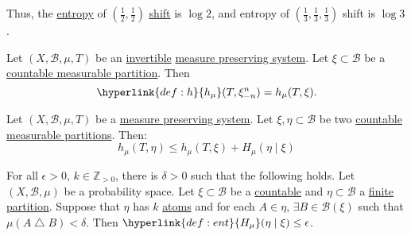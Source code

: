 \documentclass{article}
\newcommand{\sym}{\bigtriangleup}
\begin{document}
\color{black}
Thus, the \hyperlink{def:h}{entropy} of $(\frac{1}{2},\frac{1}{2})$ \hyperlink{def:bernoullishift}{shift} is $\log 2$, and entropy of $(\frac{1}{3},\frac{1}{3},\frac{1}{3})$ shift is $\log 3$.
\begin{nlemma}\label{lem:1}
  Let $(X, \mathcal{B},\mu,T)$ be an \hyperlink{def:inv}{invertible} \hyperlink{def:mps}{measure preserving system}.
  Let $\xi \subset \mathcal{B}$ be a \hyperlink{def:partition}{countable measurable partition}.
  Then
  \begin{equation*}
    \hyperlink{def:h}{h_\mu}(T, \xi_{-n}^n) = h_\mu(T, \xi).
  \end{equation*}
\end{nlemma}
\begin{nlemma}\label{lem:2}
  Let $(X, \mathcal{B}, \mu, T)$ be a \hyperlink{def:mps}{measure preserving system}. Let $\xi, \eta \subset \mathcal{B}$ be two \hyperlink{def:partition}{countable measurable partitions}. Then:
  \begin{equation*}
    h_\mu(T, \eta) \leq h_\mu(T, \xi) + H_\mu(\eta \mid \xi)
  \end{equation*}
\end{nlemma}
\begin{nlemma}\label{lem:3}
  For all $\epsilon > 0$, $k \in \mathbb{Z}_{>0}$, there is $\delta > 0$ such that the following holds.
  Let $(X, \mathcal{B}, \mu)$ be a probability space.
  Let $\xi \subset \mathcal{B}$ be a \hyperlink{def:partition}{countable} and $\eta \subset \mathcal{B}$ a \hyperlink{def:partition}{finite partition}.
  Suppose that $\eta$ has $k$ \hyperlink{def:partition}{atoms} and for each $A \in \eta$, $\exists B \in \mathcal{B}(\xi)$ such that $\mu(A \sym B) < \delta$.
  Then $\hyperlink{def:ent}{H_\mu}(\eta \mid \xi) \leq \epsilon$.
\end{nlemma}
\end{document}
